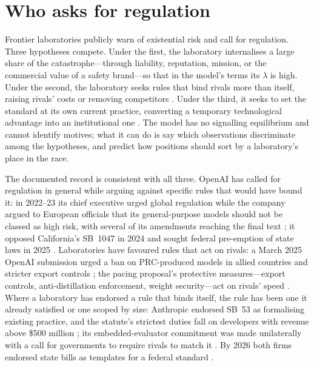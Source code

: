 \documentclass[11pt]{article}
\theoremstyle{plain}
\theoremstyle{definition}
\theoremstyle{remark}
\begin{document}
\section{Who asks for regulation}

Frontier laboratories publicly warn of existential risk and call for regulation. Three hypotheses compete. Under the first, the laboratory internalises a large share of the catastrophe---through liability, reputation, mission, or the commercial value of a safety brand---so that in the model's terms its $\lambda$ is high. Under the second, the laboratory seeks rules that bind rivals more than itself, raising rivals' costs or removing competitors \citep{stigler1971,salop1983,yandle1983}. Under the third, it seeks to set the standard at its own current practice, converting a temporary technological advantage into an institutional one \citep{cset2025}. The model has no signalling equilibrium and cannot identify motives; what it can do is say which observations discriminate among the hypotheses, and predict how positions should sort by a laboratory's place in the race.

The documented record is consistent with all three. OpenAI has called for regulation in general while arguing against specific rules that would have bound it: in 2022--23 its chief executive urged global regulation while the company argued to European officials that its general-purpose models should not be classed as high risk, with several of its amendments reaching the final text \citep{perrigo2023}; it opposed California's SB~1047 in 2024 and sought federal pre-emption of state laws in 2025 \citep{fli2025,implicator2026}. Laboratories have favoured rules that act on rivals: a March 2025 OpenAI submission urged a ban on PRC-produced models in allied countries and stricter export controls \citep{wiggers2025}; the pacing proposal's protective measures---export controls, anti-distillation enforcement, weight security---act on rivals' speed \citep{amodei2026}. Where a laboratory has endorsed a rule that binds itself, the rule has been one it already satisfied or one scoped by size: Anthropic endorsed SB~53 as formalising existing practice, and the statute's strictest duties fall on developers with revenue above \$500 million \citep{anthropic2025sb53,brookings2026}; its embedded-evaluator commitment was made unilaterally with a call for governments to require rivals to match it \citep{amodei2026}. By 2026 both firms endorsed state bills as templates for a federal standard \citep{hill2026}.
\end{document}
